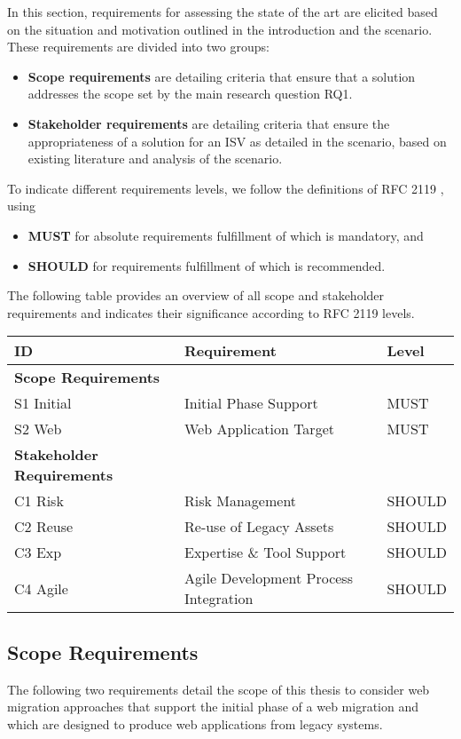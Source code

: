 In this section, requirements for assessing the state of the art are elicited based on the situation and motivation outlined in the introduction and the scenario.
These requirements are divided into two groups:

\begin{itemize}
\tightlist
\item
  \textbf{Scope requirements} are detailing criteria that ensure that a solution addresses the scope set by the main research question RQ1.
\item
  \textbf{Stakeholder requirements} are detailing criteria that ensure the appropriateness of a solution for an ISV as detailed in the scenario, based on existing literature and analysis of the scenario.
\end{itemize}

To indicate different requirements levels, we follow the definitions of RFC 2119 \autocite{IETF2119MustShould}, using

\begin{itemize}
\tightlist
\item
  \textbf{MUST} for absolute requirements fulfillment of which is mandatory, and
\item
  \textbf{SHOULD} for requirements fulfillment of which is recommended.
\end{itemize}

The following table provides an overview of all scope and stakeholder requirements and indicates their significance according to RFC 2119 levels.

\begin{longtable}[]{@{}lll@{}}
\toprule
ID & Requirement & Level\tabularnewline
\midrule
\endhead
\textbf{Scope Requirements} & &\tabularnewline
S1 Initial & Initial Phase Support & MUST\tabularnewline
S2 Web & Web Application Target & MUST\tabularnewline
\textbf{Stakeholder Requirements} & &\tabularnewline
C1 Risk & Risk Management & SHOULD\tabularnewline
C2 Reuse & Re-use of Legacy Assets & SHOULD\tabularnewline
C3 Exp & Expertise \& Tool Support & SHOULD\tabularnewline
C4 Agile & Agile Development Process Integration & SHOULD\tabularnewline
\bottomrule
\end{longtable}

\hypertarget{scope-requirements}{%
\subsection{Scope Requirements}\label{scope-requirements}}

The following two requirements detail the scope of this thesis to consider web migration approaches that support the initial phase of a web migration and which are designed to produce web applications from legacy systems.

